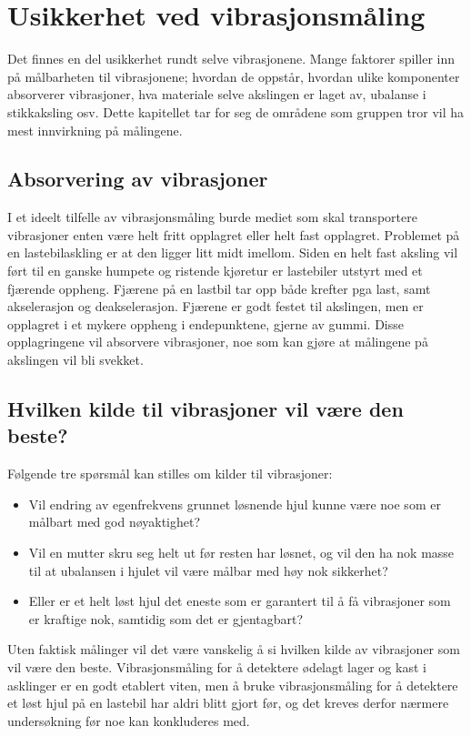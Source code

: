 \section{Usikkerhet ved vibrasjonsmåling}
Det finnes en del usikkerhet rundt selve vibrasjonene. Mange faktorer spiller inn på målbarheten til vibrasjonene; 
hvordan de oppstår, hvordan ulike komponenter absorverer vibrasjoner, hva materiale selve akslingen er laget av, 
ubalanse i stikkaksling osv. Dette kapitellet tar for seg de områdene som gruppen tror vil ha mest innvirkning på målingene.
\subsection{Absorvering av vibrasjoner}
I et ideelt tilfelle av vibrasjonsmåling burde mediet som skal transportere vibrasjoner 
enten være helt fritt opplagret eller helt fast opplagret. Problemet på en lastebilaskling 
er at den ligger litt midt imellom. Siden en helt fast aksling vil ført til en ganske humpete 
og ristende kjøretur er lastebiler utstyrt med et fjærende oppheng. Fjærene på en lastbil
 tar opp både krefter pga last, samt akselerasjon og deakselerasjon. Fjærene er godt 
festet til akslingen, men er opplagret i et mykere oppheng i endepunktene, gjerne av gummi. 
Disse opplagringene vil absorvere vibrasjoner, noe som kan gjøre at målingene på akslingen vil bli svekket.

\subsection{Hvilken kilde til vibrasjoner vil være den beste?}
Følgende tre spørsmål kan stilles om kilder til vibrasjoner:
\begin{itemize}
	\item Vil endring av egenfrekvens grunnet løsnende hjul kunne være noe som er 
målbart med god nøyaktighet?
	\item Vil en mutter skru seg helt ut før resten har
 løsnet, og vil den ha nok masse til at ubalansen i hjulet vil være målbar med 
høy nok sikkerhet? 
	\item Eller er et helt løst hjul det eneste som er garantert til å få 
vibrasjoner som er kraftige nok, samtidig som det er gjentagbart?
\end{itemize}
Uten faktisk målinger vil det være vanskelig å si hvilken kilde av vibrasjoner 
som vil være den beste. Vibrasjonsmåling for å detektere ødelagt lager og 
kast i asklinger er en godt etablert viten, men å bruke vibrasjonsmåling for 
å detektere et løst hjul på en lastebil har aldri blitt gjort før, og det kreves 
derfor nærmere undersøkning før noe kan konkluderes med. 

